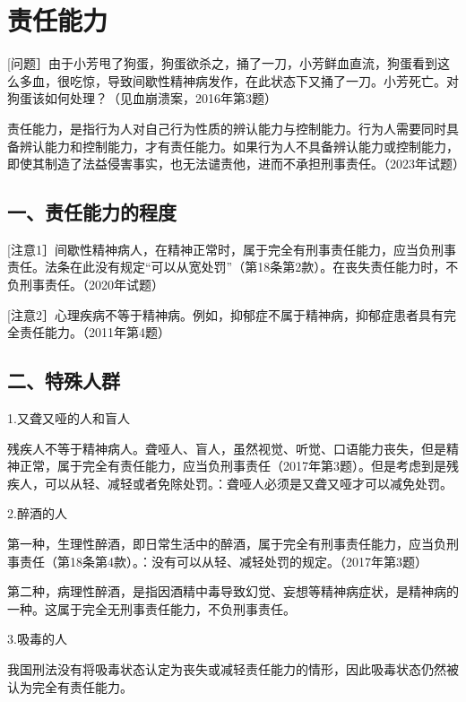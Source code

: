 \section{责任能力}

[问题］由于小芳甩了狗蛋，狗蛋欲杀之，捅了一刀，小芳鲜血直流，狗蛋看到这么多血，很吃惊，导致间歇性精神病发作，在此状态下又捅了一刀。小芳死亡。对狗蛋该如何处理？（见血崩溃案，2016年第3题）

责任能力，是指行为人对自己行为性质的辨认能力与控制能力。行为人需要同时具备辨认能力和控制能力，才有责任能力。如果行为人不具备辨认能力或控制能力，即使其制造了法益侵害事实，也无法谴责他，进而不承担刑事责任。（2023年试题）

\subsection*{一、责任能力的程度}



[注意1］间歇性精神病人，在精神正常时，属于完全有刑事责任能力，应当负刑事责任。法条在此没有规定“可以从宽处罚”（第18条第2款）。在丧失责任能力时，不负刑事责任。（2020年试题）

[注意2］心理疾病不等于精神病。例如，抑郁症不属于精神病，抑郁症患者具有完全责任能力。（2011年第4题）

\subsection*{二、特殊人群}

1.又聋又哑的人和盲人

残疾人不等于精神病人。聋哑人、盲人，虽然视觉、听觉、口语能力丧失，但是精神正常，属于完全有责任能力，应当负刑事责任（2017年第3题）。但是考虑到是残疾人，可以从轻、减轻或者免除处罚。：聋哑人必须是又聋又哑才可以减免处罚。

2.醉酒的人

第一种，生理性醉酒，即日常生活中的醉酒，属于完全有刑事责任能力，应当负刑事责任（第18条第4款）。：没有可以从轻、减轻处罚的规定。（2017年第3题）

第二种，病理性醉酒，是指因酒精中毒导致幻觉、妄想等精神病症状，是精神病的一种。这属于完全无刑事责任能力，不负刑事责任。

3.吸毒的人

我国刑法没有将吸毒状态认定为丧失或减轻责任能力的情形，因此吸毒状态仍然被认为完全有责任能力。

